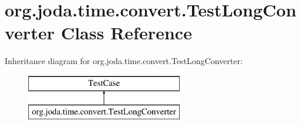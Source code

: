 \hypertarget{classorg_1_1joda_1_1time_1_1convert_1_1_test_long_converter}{\section{org.\-joda.\-time.\-convert.\-Test\-Long\-Converter Class Reference}
\label{classorg_1_1joda_1_1time_1_1convert_1_1_test_long_converter}
}
Inheritance diagram for org.\-joda.\-time.\-convert.\-Test\-Long\-Converter\-:\begin{figure}[H]
\begin{center}
\leavevmode
\includegraphics[height=2.000000cm]{classorg_1_1joda_1_1time_1_1convert_1_1_test_long_converter}
\end{center}
\end{figure}
